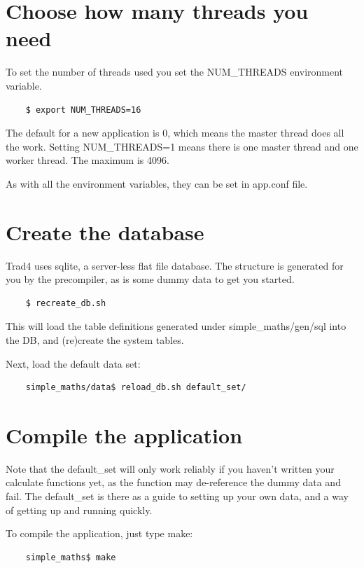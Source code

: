 \documentclass{report}
\begin{document}
\section{Choose how many threads you need}

To set the number of threads used you set the NUM_THREADS environment variable.

\begin{verbatim}
    $ export NUM_THREADS=16
\end{verbatim}

The default for a new application is 0, which means the master thread does all the work. Setting NUM_THREADS=1 means there is one master thread and one worker thread. The maximum is 4096.

As with all the environment variables, they can be set in app.conf file.


\section{Create the database}

Trad4 uses sqlite, a server-less flat file database. The structure is generated for you by the precompiler, as is some dummy data to get you started.

\begin{verbatim}
    $ recreate_db.sh
\end{verbatim}

This will load the table definitions generated under simple_maths/gen/sql into the DB, and (re)create the 
system tables.

Next, load the default data set:

\begin{verbatim}
    simple_maths/data$ reload_db.sh default_set/
\end{verbatim}

\section{Compile the application}

Note that the default_set will only work reliably if you haven't written your calculate functions yet, as the function may de-reference the dummy data and fail. The default_set is there as a guide to setting up your own data, and a way of getting up and running quickly.

To compile the application, just type make:

\begin{verbatim}
    simple_maths$ make
\end{verbatim}
\end{document}
